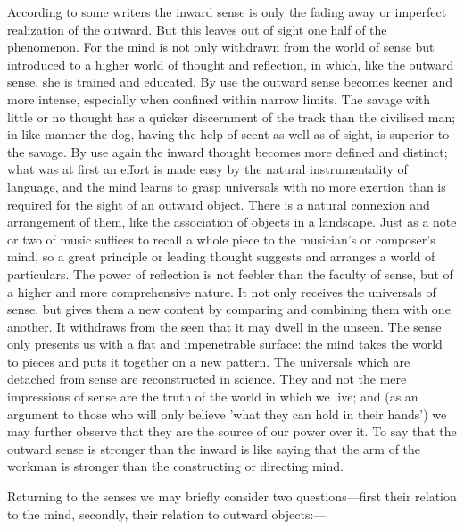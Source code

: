 \documentclass[11pt,letter]{article}
\begin{document}
\par  According to some writers the inward sense is only the fading away or imperfect realization of the outward. But this leaves out of sight one half of the phenomenon. For the mind is not only withdrawn from the world of sense but introduced to a higher world of thought and reflection, in which, like the outward sense, she is trained and educated. By use the outward sense becomes keener and more intense, especially when confined within narrow limits. The savage with little or no thought has a quicker discernment of the track than the civilised man; in like manner the dog, having the help of scent as well as of sight, is superior to the savage. By use again the inward thought becomes more defined and distinct; what was at first an effort is made easy by the natural instrumentality of language, and the mind learns to grasp universals with no more exertion than is required for the sight of an outward object. There is a natural connexion and arrangement of them, like the association of objects in a landscape. Just as a note or two of music suffices to recall a whole piece to the musician's or composer's mind, so a great principle or leading thought suggests and arranges a world of particulars. The power of reflection is not feebler than the faculty of sense, but of a higher and more comprehensive nature. It not only receives the universals of sense, but gives them a new content by comparing and combining them with one another. It withdraws from the seen that it may dwell in the unseen. The sense only presents us with a flat and impenetrable surface: the mind takes the world to pieces and puts it together on a new pattern. The universals which are detached from sense are reconstructed in science. They and not the mere impressions of sense are the truth of the world in which we live; and (as an argument to those who will only believe 'what they can hold in their hands') we may further observe that they are the source of our power over it. To say that the outward sense is stronger than the inward is like saying that the arm of the workman is stronger than the constructing or directing mind.

\par  Returning to the senses we may briefly consider two questions—first their relation to the mind, secondly, their relation to outward objects:—
\end{document}
